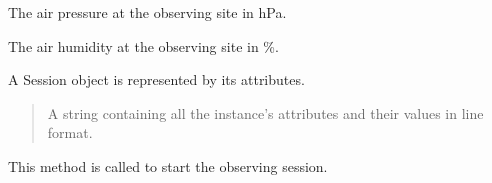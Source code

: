 \documentclass[letterpaper,10pt,english]{sphinxmanual}
\begin{document}
\begin{fulllineitems}
\begin{fulllineitems}
\label{\detokenize{autoapi/aop/aop/index:aop.aop.Session.pressure}}
\pysigstartsignatures
{}
\pysigstopsignatures
\sphinxAtStartPar
The air pressure at the observing site in hPa.

\end{fulllineitems}


\begin{fulllineitems}
\label{\detokenize{autoapi/aop/aop/index:aop.aop.Session.humidity}}
\pysigstartsignatures
{}
\pysigstopsignatures
\sphinxAtStartPar
The air humidity at the observing site in \%.

\end{fulllineitems}


\begin{fulllineitems}
\label{\detokenize{autoapi/aop/aop/index:aop.aop.Session.__repr__}}
\pysigstartsignatures
{}
\pysigstopsignatures
\sphinxAtStartPar
A Session object is represented by its attributes.
\begin{quote}\begin{description}
\sphinxAtStartPar
A string containing all the instance’s attributes and their values
in line format.

\sphinxAtStartPar
{}

\end{description}\end{quote}

\end{fulllineitems}


\begin{fulllineitems}
\label{\detokenize{autoapi/aop/aop/index:aop.aop.Session.start}}
\pysigstartsignatures
{}
\pysigstopsignatures
\sphinxAtStartPar
This method is called to start the observing session.


\end{fulllineitems}
\end{fulllineitems}
\end{document}
